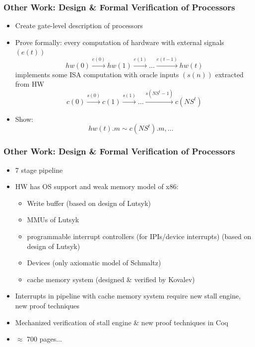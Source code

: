 \documentclass{beamer}
\begin{document}
\begin{frame}
\frametitle{Other Work: Design \& Formal Verification of Processors}
\begin{itemize}
	\item Create gate-level description of processors
	\item Prove formally: every computation of hardware with external signals $(e(t))$
	\[ hw(0) \overset{e(0)}\longrightarrow hw(1) \overset{e(1)}\longrightarrow \ldots \overset{e(t-1)}\longrightarrow hw(t) \]
	implements some ISA computation with oracle inputs $(s(n))$ extracted from HW
	\[ c(0) \overset{s(0)}\longrightarrow c(1) \overset{s(1)}\longrightarrow \ldots \overset{s(NS^{t}-1)}\longrightarrow c(NS^{t}) \]
	\item Show:
	\[ hw(t).m \sim c(NS^{t}).m , \ldots \quad \]
\end{itemize} 
\end{frame}

\begin{frame}
\frametitle{Other Work: Design \& Formal Verification of Processors}
\begin{itemize}
	\item 7 stage pipeline
	\item HW has OS support and weak memory model of x86:
	\begin{itemize}
		\item Write buffer (based on design of Lutsyk)
		\item MMUs of Lutsyk
		\item programmable interrupt controllers (for IPIs/device interrupts) (based on design of Lutsyk)
		\item Devices (only axiomatic model of Schmaltz)
		\item cache memory system (designed \& verified by Kovalev)
	\end{itemize}
	\item Interrupts in pipeline with cache memory system require new stall engine, new proof techniques
	\item Mechanized verification of stall engine \& new proof techniques in Coq
	\item $\approx$ 700 pages...
\end{itemize}
\end{frame}


\end{document}
